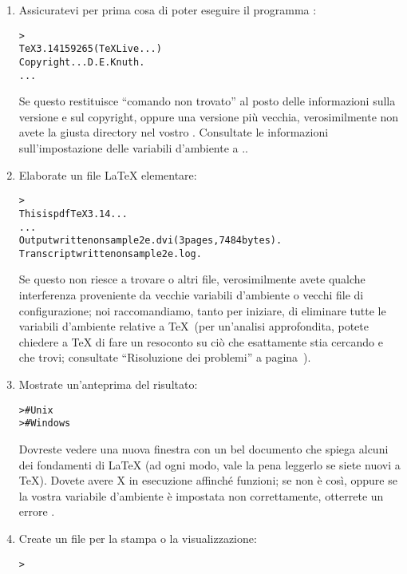 \documentclass{article}
\begin{document}
\begin{enumerate}

\item Assicuratevi per prima cosa di poter eseguire il programma
:
\begin{alltt}
> 
TeX 3.14159265 (TeX Live ...)
Copyright ... D.E. Knuth.
...
\end{alltt}
Se questo restituisce ``comando non trovato'' al posto delle informazioni
sulla versione e sul copyright, oppure una versione più vecchia,
verosimilmente non avete la giusta directory  nel vostro
. Consultate le informazioni sull'impostazione delle
variabili d'ambiente a \p.\pageref{sec:env}.

\item Elaborate un file \LaTeX{} elementare:
\begin{alltt}
> 
This is pdfTeX 3.14...
...
Output written on sample2e.dvi (3 pages, 7484 bytes).
Transcript written on sample2e.log.
\end{alltt}
Se questo non riesce a trovare  o altri file,
verosimilmente avete qualche interferenza proveniente da vecchie variabili
d'ambiente o vecchi file di configurazione; noi raccomandiamo, tanto per
iniziare, di eliminare tutte le variabili d'ambiente relative a \TeX\ (per
un'analisi approfondita, potete chiedere a \TeX{} di fare un resoconto su
ciò che esattamente stia cercando e che trovi; consultate ``Risoluzione
dei problemi'' a pagina~\pageref{sec:debugging}).

\item Mostrate un'anteprima del risultato:
\begin{alltt}
>     # Unix
>   # Windows
\end{alltt}
Dovreste vedere una nuova finestra con un bel documento che spiega alcuni
dei fondamenti di \LaTeX{} (ad ogni modo, vale la pena leggerlo se siete
nuovi a \TeX). Dovete avere X in esecuzione affinché 
funzioni; se non è così, oppure se la vostra variabile d'ambiente
 è impostata non correttamente, otterrete un errore
.

\item Create un file \PS{} per la stampa o la visualizzazione:
\begin{alltt}
> 
\end{alltt}


\end{enumerate}
\end{document}
